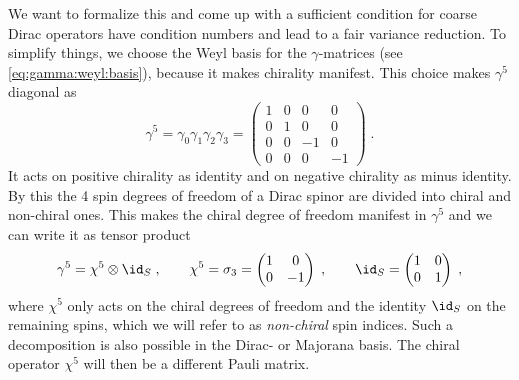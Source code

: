 We want to formalize this and come up with a sufficient condition for coarse Dirac operators have condition numbers and lead to a fair variance reduction.
To simplify things, we choose the Weyl basis for the $\gamma$-matrices (see \cref{eq:gamma:weyl:basis}), because it makes chirality manifest.
This choice makes $\gamma^5$ diagonal as
\begin{equation}
\gamma^5 =
\gamma_0 \gamma_1 \gamma_2 \gamma_3 =
\begin{pmatrix}
1 & 0 & 0 & 0 \\
0 & 1 & 0 & 0 \\
0 & 0 & -1 & 0 \\
0 & 0 & 0 & -1
\end{pmatrix} \;.
\end{equation}
It acts on positive chirality as identity and on negative chirality as minus identity.
By this the \num{4} spin degrees of freedom of a Dirac spinor are divided into chiral and non-chiral ones.
This makes the chiral degree of freedom manifest in $\gamma^5$ and we can write it as tensor product
\begin{equation} \label{eq:strict:separable}
\gamma^5 = \chi^5 \otimes \id_S \;,
\qquad
\chi^5 = 
\sigma_3 = 
\begin{pmatrix}
1 & 0 \\
0 & -1
\end{pmatrix} \;,
\qquad
\id_S = 
\begin{pmatrix}
1 & 0 \\
0 & 1
\end{pmatrix} \;,
\end{equation}
where $\chi^5$ only acts on the chiral degrees of freedom and the identity $\id_S$ on the remaining spins, which we will refer to as \emph{non-chiral} spin indices.
Such a decomposition is also possible in the Dirac- or Majorana basis.
The chiral operator $\chi^5$ will then be a different Pauli matrix.

